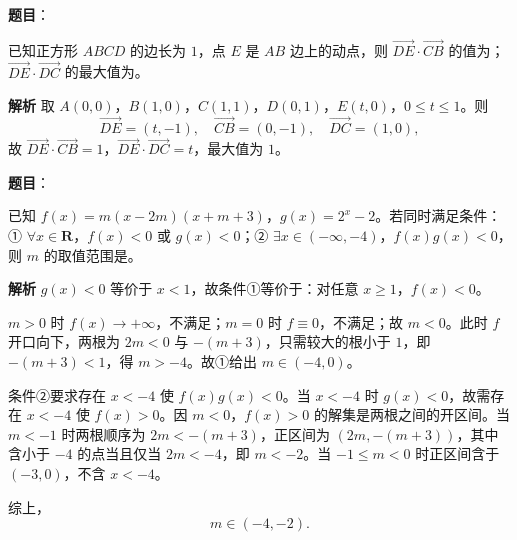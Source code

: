 \begin{answer}

\textbf{题目}：

已知正方形 $ABCD$ 的边长为 $1$，点 $E$ 是 $AB$ 边上的动点，则 $\overrightarrow{DE}\cdot\overrightarrow{CB}$ 的值为\gkblank{}；$\overrightarrow{DE}\cdot\overrightarrow{DC}$ 的最大值为\gkblank{}。

\textbf{解析}
取 $A(0,0)$，$B(1,0)$，$C(1,1)$，$D(0,1)$，$E(t,0)$，$0\leqslant t\leqslant1$。则
\nopagebreak[4]
\[\overrightarrow{DE}=(t,-1),\quad \overrightarrow{CB}=(0,-1),\quad \overrightarrow{DC}=(1,0),\]
故 $\overrightarrow{DE}\cdot\overrightarrow{CB}=1$，$\overrightarrow{DE}\cdot\overrightarrow{DC}=t$，最大值为 $1$。


\end{answer}
\begin{answer}

\textbf{题目}：

已知 $f(x)=m(x-2m)(x+m+3)$，$g(x)=2^x-2$。若同时满足条件：① $\forall x\in\mathbf R$，$f(x)<0$ 或 $g(x)<0$；② $\exists x\in(-\infty,-4)$，$f(x)g(x)<0$，则 $m$ 的取值范围是\gkblank{}。

\textbf{解析}
$g(x)<0$ 等价于 $x<1$，故条件①等价于：对任意 $x\geqslant1$，$f(x)<0$。

$m>0$ 时 $f(x)\to+\infty$，不满足；$m=0$ 时 $f\equiv0$，不满足；故 $m<0$。此时 $f$ 开口向下，两根为 $2m<0$ 与 $-(m+3)$，只需较大的根小于 $1$，即 $-(m+3)<1$，得 $m>-4$。故①给出 $m\in(-4,0)$。

条件②要求存在 $x<-4$ 使 $f(x)g(x)<0$。当 $x<-4$ 时 $g(x)<0$，故需存在 $x<-4$ 使 $f(x)>0$。因 $m<0$，$f(x)>0$ 的解集是两根之间的开区间。当 $m<-1$ 时两根顺序为 $2m<-(m+3)$，正区间为 $(2m,-(m+3))$，其中含小于 $-4$ 的点当且仅当 $2m<-4$，即 $m<-2$。当 $-1\leqslant m<0$ 时正区间含于 $(-3,0)$，不含 $x<-4$。

综上，
\nopagebreak[4]
\[m\in(-4,-2).\]


\end{answer}
